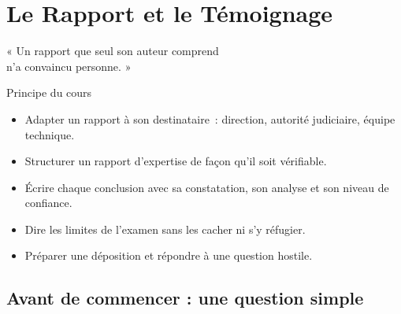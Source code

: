 
\chapter{Le Rapport et le Témoignage}
\label{chap:rapport}

\epigraph{%
    « Un rapport que seul son auteur comprend\\
    n'a convaincu personne. »%
}{Principe du cours}


\begin{boxobjectifs}
\begin{itemize}
    \item Adapter un rapport à son destinataire~: direction, autorité
          judiciaire, équipe technique.
    \item Structurer un rapport d'expertise de façon qu'il soit vérifiable.
    \item Écrire chaque conclusion avec sa constatation, son analyse et son
          niveau de confiance.
    \item Dire les limites de l'examen sans les cacher ni s'y réfugier.
    \item Préparer une déposition et répondre à une question hostile.
\end{itemize}
\end{boxobjectifs}

\bigskip

\section*{Avant de commencer : une question simple}

